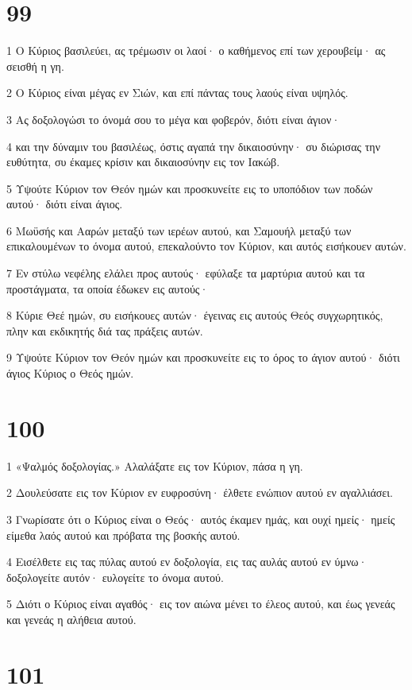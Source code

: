 \chapter{99}

\par 1 Ο Κύριος βασιλεύει, ας τρέμωσιν οι λαοί· ο καθήμενος επί των χερουβείμ· ας σεισθή η γη.
\par 2 Ο Κύριος είναι μέγας εν Σιών, και επί πάντας τους λαούς είναι υψηλός.
\par 3 Ας δοξολογώσι το όνομά σου το μέγα και φοβερόν, διότι είναι άγιον·
\par 4 και την δύναμιν του βασιλέως, όστις αγαπά την δικαιοσύνην· συ διώρισας την ευθύτητα, συ έκαμες κρίσιν και δικαιοσύνην εις τον Ιακώβ.
\par 5 Υψούτε Κύριον τον Θεόν ημών και προσκυνείτε εις το υποπόδιον των ποδών αυτού· διότι είναι άγιος.
\par 6 Μωϋσής και Ααρών μεταξύ των ιερέων αυτού, και Σαμουήλ μεταξύ των επικαλουμένων το όνομα αυτού, επεκαλούντο τον Κύριον, και αυτός εισήκουεν αυτών.
\par 7 Εν στύλω νεφέλης ελάλει προς αυτούς· εφύλαξε τα μαρτύρια αυτού και τα προστάγματα, τα οποία έδωκεν εις αυτούς·
\par 8 Κύριε Θεέ ημών, συ εισήκουες αυτών· έγεινας εις αυτούς Θεός συγχωρητικός, πλην και εκδικητής διά τας πράξεις αυτών.
\par 9 Υψούτε Κύριον τον Θεόν ημών και προσκυνείτε εις το όρος το άγιον αυτού· διότι άγιος Κύριος ο Θεός ημών.

\chapter{100}

\par 1 «Ψαλμός δοξολογίας.» Αλαλάξατε εις τον Κύριον, πάσα η γη.
\par 2 Δουλεύσατε εις τον Κύριον εν ευφροσύνη· έλθετε ενώπιον αυτού εν αγαλλιάσει.
\par 3 Γνωρίσατε ότι ο Κύριος είναι ο Θεός· αυτός έκαμεν ημάς, και ουχί ημείς· ημείς είμεθα λαός αυτού και πρόβατα της βοσκής αυτού.
\par 4 Εισέλθετε εις τας πύλας αυτού εν δοξολογία, εις τας αυλάς αυτού εν ύμνω· δοξολογείτε αυτόν· ευλογείτε το όνομα αυτού.
\par 5 Διότι ο Κύριος είναι αγαθός· εις τον αιώνα μένει το έλεος αυτού, και έως γενεάς και γενεάς η αλήθεια αυτού.

\chapter{101}

